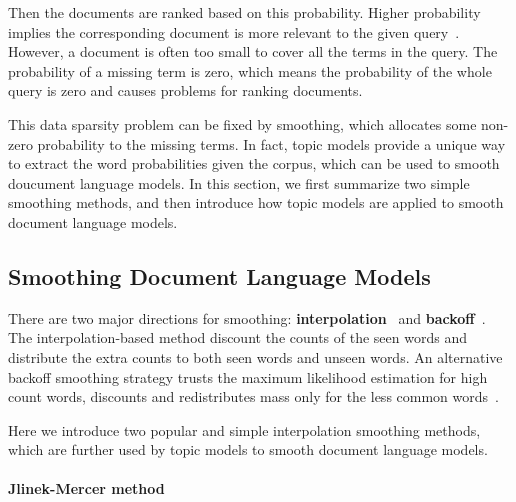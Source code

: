 Then the documents are ranked based on this probability. Higher probability implies the corresponding document is more relevant to the given query~\citep{song-99}. However, a document is often too small to cover all the terms in the query. The probability of a missing term is zero, which means the probability of the whole query is zero and causes problems for ranking documents. 

This data sparsity problem can be fixed by smoothing, which allocates some non-zero probability to the missing terms. In fact, topic models provide a unique way to extract the word probabilities given the corpus, which can be used to smooth doucument language models.
In this section, we first summarize two simple smoothing methods, and then introduce how topic models are applied to smooth document language models.

\subsection{Smoothing Document Language Models}


There are two major directions for smoothing: \textbf{interpolation}~\citep{Jelinek-1980,mackay95dirichlet,Ney-1994,PonteCroft,zhai-01} and \textbf{backoff}~\citep{katz-87,song-99}. The interpolation-based method discount the counts of the seen words and distribute the extra counts to both seen words and unseen words. An alternative backoff smoothing strategy trusts the maximum likelihood estimation for high count words, discounts and  redistributes mass only for the less common words~\citep{zhai-01}.

Here we introduce two popular and simple interpolation smoothing methods, which are further used by topic models to smooth document language models.

\paragraph{Jlinek-Mercer method}

